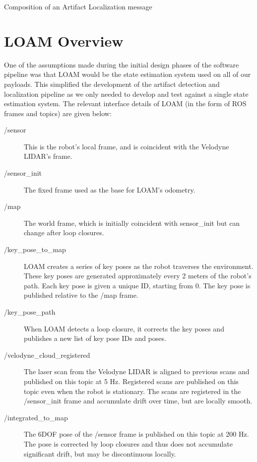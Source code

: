 \begin{table}
	\centering
	\begin{adjustbox}{max width=.95\textwidth}
	\end{adjustbox}
	\caption{Composition of an Artifact Localization message}
	\label{artifact_localization}
\end{table}

\section{LOAM Overview}

One of the assumptions made during the initial design phases of the software pipeline was that LOAM would be the state estimation system used on all of our payloads. This simplified the development of the artifact detection and localization pipeline as we only needed to develop and test against a single state estimation system. The relevant interface details of LOAM (in the form of ROS frames and topics) are given below:

\begin{description}
	\item[/sensor] This is the robot's local frame, and is coincident with the Velodyne LIDAR's frame.
	\item[/sensor\_init] The fixed frame used as the base for LOAM's odometry.
	\item[/map] The world frame, which is initially coincident with sensor\_init but can change after loop closures.
	\item[/key\_pose\_to\_map] LOAM creates a series of key poses as the robot traverses the environment. These key poses are generated approximately every 2 meters of the robot's path. Each key pose is given a unique ID, starting from 0. The key pose is published relative to the /map frame.
	\item[/key\_pose\_path] When LOAM detects a loop closure, it corrects the key poses and publishes a new list of key pose IDs and poses.
	\item[/velodyne\_cloud\_registered] The laser scan from the Velodyne LIDAR is aligned to previous scans and published on this topic at 5 Hz. Registered scans are published on this topic even when the robot is stationary. The scans are registered in the /sensor\_init frame and accumulate drift over time, but are locally smooth.
	\item[/integrated\_to\_map] The 6DOF pose of the /sensor frame is published on this topic at 200 Hz. The pose is corrected by loop closures and thus does not accumulate significant drift, but may be discontinuous locally.
\end{description}

